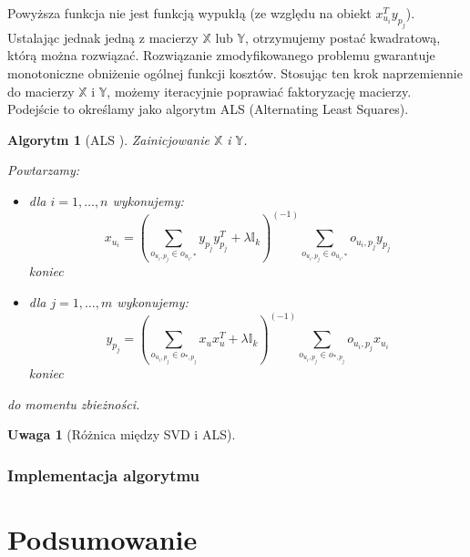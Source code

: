 \documentclass[12pt,a4paper]{report}
\newtheorem{algorytm}[df]{Algorytm}
\newtheorem{uwaga}[df]{Uwaga}
\begin{document}
Powyższa funkcja nie jest funkcją wypukłą (ze względu na obiekt $x_{u_i}^Ty_{p_j}$). Ustalając jednak jedną z macierzy $\mathbb{X}$ lub $\mathbb{Y}$, otrzymujemy postać kwadratową, którą można rozwiązać. Rozwiązanie zmodyfikowanego problemu gwarantuje monotoniczne obniżenie ogólnej funkcji kosztów. Stosując ten krok naprzemiennie do macierzy $\mathbb{X}$ i $\mathbb{Y}$, możemy iteracyjnie poprawiać faktoryzację macierzy. Podejście to określamy jako algorytm ALS (Alternating Least Squares).

\begin{algorytm}[ALS {\citep{mcvals}}]
Zainicjowanie $\mathbb{X}$ i $\mathbb{Y}$.

Powtarzamy:
\begin{itemize}
\item dla $i = 1, \ldots, n $ wykonujemy: 
$$
x_{u_i} = (\sum_{o_{u_i,p_j} \in o_{u_i,*}} y_{p_j} y_{p_j}^T + \lambda \mathbb{I}_k)^{(-1)} \sum_{o_{u_i,p_j} \in o_{u_i,*}} o_{u_i,p_j}y_{p_j}
$$
koniec
\item dla $j = 1, \ldots, m$ wykonujemy:
$$
y_{p_j} = (\sum_{o_{u_i,p_j} \in o_{*,p_j}} x_u x_u^T + \lambda \mathbb{I}_k)^{(-1)} \sum_{o_{u_i,p_j} \in o_{*,p_j}} o_{u_i,p_j}x_{u_i}
$$
koniec
\end{itemize}
do momentu zbieżności.
\end{algorytm}
\begin{uwaga}[Różnica między SVD i ALS]
\end{uwaga}

\subsection{Implementacja algorytmu}
\chapter{Podsumowanie}



\nocite{*} %


\end{document}
